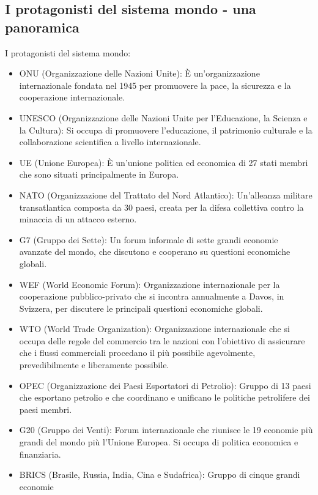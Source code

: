 \documentclass{article}
\begin{document}
\subsection{I protagonisti del sistema mondo - una panoramica}
I protagonisti del sistema mondo:
\begin{itemize}
    \item ONU (Organizzazione delle Nazioni Unite): È un'organizzazione internazionale fondata
        nel 1945 per promuovere la pace, la sicurezza e la cooperazione internazionale.
    \item UNESCO (Organizzazione delle Nazioni Unite per l'Educazione, la Scienza e la Cultura):
        Si occupa di promuovere l'educazione, il patrimonio culturale e la collaborazione
        scientifica a livello internazionale.
    \item UE (Unione Europea): È un'unione politica ed economica di 27 stati membri che sono
        situati principalmente in Europa.
    \item NATO (Organizzazione del Trattato del Nord Atlantico): Un'alleanza militare
        transatlantica composta da 30 paesi, creata per la difesa collettiva contro la minaccia
        di un attacco esterno.
    \item G7 (Gruppo dei Sette): Un forum informale di sette grandi economie avanzate del mondo,
        che discutono e cooperano su questioni economiche globali.
    \item WEF (World Economic Forum): Organizzazione internazionale per la cooperazione
        pubblico-privato che si incontra annualmente a Davos, in Svizzera, per discutere le
        principali questioni economiche globali.
    \item WTO (World Trade Organization): Organizzazione internazionale che si occupa delle
        regole del commercio tra le nazioni con l'obiettivo di assicurare che i flussi
        commerciali procedano il più possibile agevolmente, prevedibilmente e liberamente
        possibile.
    \item OPEC (Organizzazione dei Paesi Esportatori di Petrolio): Gruppo di 13 paesi che
        esportano petrolio e che coordinano e unificano le politiche petrolifere dei paesi
        membri.
    \item G20 (Gruppo dei Venti): Forum internazionale che riunisce le 19 economie più grandi
        del mondo più l'Unione Europea. Si occupa di politica economica e finanziaria.
    \item BRICS (Brasile, Russia, India, Cina e Sudafrica): Gruppo di cinque grandi economie

\end{itemize}
\end{document}
